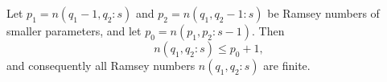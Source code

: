 Let $p_1 = n(q_1 - 1, q_2 : s)$ and $p_2 = n(q_1, q_2 - 1 : s)$ be Ramsey numbers of smaller parameters, and let $p_0 = n(p_1, p_2 : s - 1)$. Then
$$n(q_1, q_2 : s) \leq p_0 + 1,$$
and consequently all Ramsey numbers $n(q_1, q_2 : s)$ are finite.
